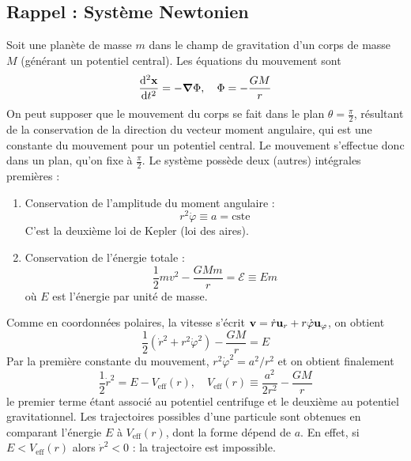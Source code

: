 \subsection{Rappel : Système Newtonien}
Soit une planète de masse $m$ dans le champ de gravitation d'un corps de masse $M$ (générant un potentiel central). Les équations du mouvement sont 
\begin{equation}
    \frac{\mathrm{d}^2 \bm{\mathrm{x}}}{\mathrm{d} t^2} = - \bm{\mathrm{\nabla}} \Phi, \quad \Phi = - \frac{GM}{r}
\end{equation}
On peut supposer que le mouvement du corps se fait dans le plan $\theta = \frac{\pi}{2}$, résultant de la conservation de la direction du vecteur moment angulaire, qui est une constante du mouvement pour un potentiel central. Le mouvement s'effectue donc dans un plan, qu'on fixe à $\frac{\pi}{2}$. Le système possède deux (autres) intégrales premières :
\begin{enumerate}
    \item Conservation de l'amplitude du moment angulaire :
    \begin{equation}
        r^2 \dot{\varphi} \equiv a = \text{cste}
    \end{equation}
    C'est la deuxième loi de Kepler (loi des aires).
    \item Conservation de l'énergie totale :
    \begin{equation}
        \frac{1}{2} mv^2 - \frac{GMm}{r} = \mathcal{E} \equiv Em
    \end{equation}
    où $E$ est l'énergie par unité de masse. 
\end{enumerate}
Comme en coordonnées polaires, la vitesse s'écrit $\bm{\mathrm{v}} = \dot{r} \bm{\mathrm{u}}_r + r \dot{\varphi} \bm{\mathrm{u}}_\varphi$, on obtient
\begin{equation}
    \frac{1}{2} (\dot{r}^2+r^2\dot{\varphi}^2) - \frac{GM}{r} = E
\end{equation}
Par la première constante du mouvement, $r^2 \dot{\varphi}^2 = a^2/r^2$ et on obtient finalement
\begin{equation}
    \label{eq:kepler newton}
    \frac{1}{2} \dot{r}^2 = E - V_\text{eff}(r), \quad V_\text{eff}(r) \equiv \frac{a^2}{2r^2} - \frac{GM}{r}
\end{equation}
le premier terme étant associé au potentiel centrifuge et le deuxième au potentiel gravitationnel. Les trajectoires possibles d'une particule sont obtenues en comparant l'énergie $E$ à $V_\text{eff}(r)$, dont la forme dépend de $a$. En effet, si  $E < V_\text{eff}(r)$ alors $\dot{r}^2 < 0$ : la trajectoire est impossible.\\
